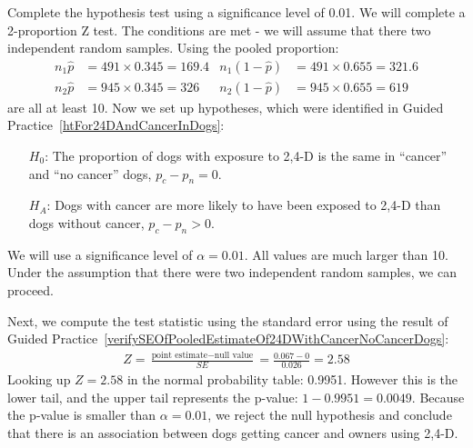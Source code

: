 \begin{example}{Complete the hypothesis test using a significance level of 0.01.}
We will complete a 2-proportion Z test.  The conditions are met  - we will assume that there two independent random samples.  Using the pooled proportion:
\begin{align*}
n_1\hat{p} &= 491 \times 0.345 = 169.4
	& n_1(1 - \hat{p}) &= 491 \times 0.655 = 321.6 \\
n_2\hat{p} &= 945 \times 0.345 = 326
	& n_2(1 - \hat{p}) &= 945 \times 0.655 = 619
\end{align*}
are all at least 10.  Now we set up hypotheses, which were identified in Guided Practice~\ref{htFor24DAndCancerInDogs}:
\begin{itemize}
\item[$H_0$:] The proportion of dogs with exposure to 2,4-D is the same in ``cancer'' and ``no cancer'' dogs, $p_c - p_n = 0$.
\item[$H_A$:] Dogs with cancer are more likely to have been exposed to 2,4-D than dogs without cancer, $p_c - p_n > 0$.
\end{itemize}
We will use a significance level of $\alpha = 0.01$. All values are much larger than 10. Under the assumption that there were two independent random samples, we can proceed.

Next, we compute the test statistic using the standard error using the result of Guided Practice~\ref{verifySEOfPooledEstimateOf24DWithCancerNoCancerDogs}:
\begin{eqnarray*}
Z = \frac{\text{point estimate} - \text{null value}}{SE} = \frac{0.067 - 0}{0.026} = 2.58
\end{eqnarray*}
Looking up $Z=2.58$ in the normal probability table: 0.9951. However this is the lower tail, and the upper tail represents the p-value: $1-0.9951 = 0.0049$. Because the p-value is smaller than $\alpha = 0.01$, we reject the null hypothesis and conclude that there is an association between dogs getting cancer and owners using 2,4-D.
\end{example}

 
